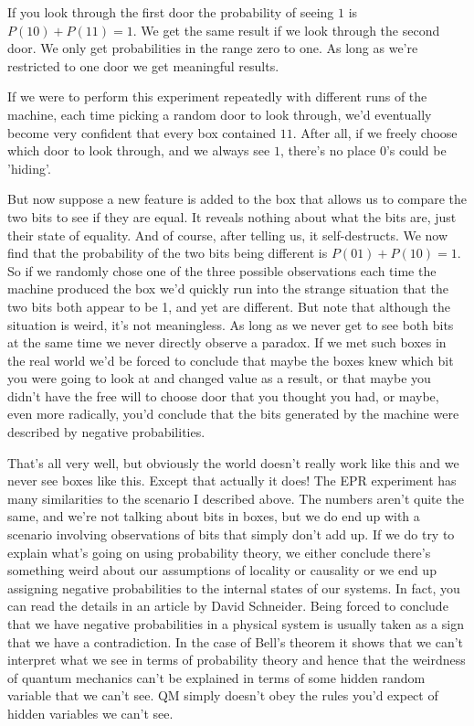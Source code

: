 \documentclass[12pt]{article}
\begin{document}
If you look through the first door the probability of seeing $1$ is $P(10)+P(11)=1$. We get the same result if we look through the second door. We only get probabilities in the range zero to one. As long as we're restricted to one door we get meaningful results.

If we were to perform this experiment repeatedly with different runs of the machine, each time picking a random door to look through, we'd eventually become very confident that every box contained $11$. After all, if we freely choose which door to look through, and we always see $1$, there's no place $0$'s could be 'hiding'.

But now suppose a new feature is added to the box that allows us to compare the two bits to see if they are equal. It reveals nothing about what the bits are, just their state of equality. And of course, after telling us, it self-destructs. We now find that the probability of the two bits being different is $P(01)+P(10)=1$.
So if we randomly chose one of the three possible observations each time the machine produced the box we'd quickly run into the strange situation that the two bits both appear to be 1, and yet are different. But note that although the situation is weird, it's not meaningless. As long as we never get to see both bits at the same time we never directly observe a paradox. If we met such boxes in the real world we'd be forced to conclude that maybe the boxes knew which bit you were going to look at and changed value as a result, or that maybe you didn't have the free will to choose door that you thought you had, or maybe, even more radically, you'd conclude that the bits generated by the machine were described by negative probabilities.

That's all very well, but obviously the world doesn't really work like this and we never see boxes like this. Except that actually it does! The EPR experiment has many similarities to the scenario I described above. The numbers aren't quite the same, and we're not talking about bits in boxes, but we do end up with a scenario involving observations of bits that simply don't add up. If we do try to explain what's going on using probability theory, we either conclude there's something weird about our assumptions of locality or causality or we end up assigning negative probabilities to the internal states of our systems. In fact, you can read the details in an article by David Schneider. Being forced to conclude that we have negative probabilities in a physical system is usually taken as a sign that we have a contradiction. In the case of Bell's theorem it shows that we can't interpret what we see in terms of probability theory and hence that the weirdness of quantum mechanics can't be explained in terms of some hidden random variable that we can't see. QM simply doesn't obey the rules you'd expect of hidden variables we can't see.
\end{document}
